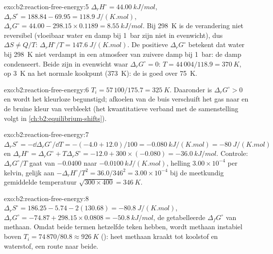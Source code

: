 \begin{solution}{exo:b2:reaction-free-energy:5}
$\Delta_r H^\circ = \qty{44.00}{kJ/mol}$, $\Delta_r S^\circ = 188.84 - 69.95 =
\qty{118.9}{J/(K.mol)}$, $\Delta_r G^\circ = 44.00 - 298.15 \times 0.1189 =
\qty{+8.55}{kJ/mol}$. Bij \qty{298}{K} is de verandering niet reversibel (vloeibaar
water en damp bij \qty{1}{bar} zijn niet in evenwicht), dus $\Delta S \ne
Q/T$: $\Delta_r H^\circ/T = \qty{147.6}{J/(K.mol)}$. De positieve
$\Delta_r G^\circ$ betekent dat water bij \qty{298}{K} niet verdampt in
een atmosfeer van zuivere damp bij \qty{1}{bar}: de damp condenseert. Beide
zijn in evenwicht waar $\Delta_r G^\circ = 0$: $T = 44\,004/118.9 =
\qty{370}{K}$, op \qty{3}{K} na het normale kookpunt
(\qty{373}{K}): de  is goed over \qty{75}{K}.
\end{solution}

\begin{solution}{exo:b2:reaction-free-energy:6}
$T_i = 57\,100/175.7 = \qty{325}{K}$. Daaronder is $\Delta_r G^\circ > 0$ en
wordt het kleurloze  begunstigd; afkoelen van de buis verschuift het gas naar
 en de bruine kleur van  verbleekt (het kwantitatieve verband met
de samenstelling volgt in \cref{ch:b2:equilibrium-shifts}).
\end{solution}

\begin{solution}{exo:b2:reaction-free-energy:7}
$\Delta_r S^\circ = -\dd\Delta_r G^\circ/\dd T = -(-4.0 + 12.0)/100 =
\qty{-0.080}{kJ/(K.mol)} = \qty{-80}{J/(K.mol)}$ en $\Delta_r H^\circ =
\Delta_r G^\circ + T\Delta_r S^\circ = -12.0 + 300 \times (-0.080) =
\qty{-36.0}{kJ/mol}$. Controle: $\Delta_r G^\circ/T$ gaat van $-0.0400$ naar
$\qty{-0.0100}{kJ/(K.mol)}$, helling $3.00 \times 10^{-4}$ per kelvin, gelijk aan
$-\Delta_r H^\circ/T^2 = 36.0/346^2 = 3.00 \times 10^{-4}$ bij de meetkundig
gemiddelde temperatuur $\sqrt{300 \times 400} = \qty{346}{K}$.
\end{solution}

\begin{solution}{exo:b2:reaction-free-energy:8}
$\Delta_r S^\circ = 186.25 - 5.74 - 2(130.68) = \qty{-80.8}{J/(K.mol)}$,
$\Delta_r G^\circ = -74.87 + 298.15 \times 0.0808 = \qty{-50.8}{kJ/mol}$,
de getabelleerde $\Delta_f G^\circ$ van methaan. Omdat beide termen hetzelfde
teken hebben, wordt methaan instabiel boven $T_i = 74\,870/80.8 \approx
\qty{926}{K}$ (): heet methaan kraakt tot koolstof en
waterstof, een route naar beide.
\end{solution}

